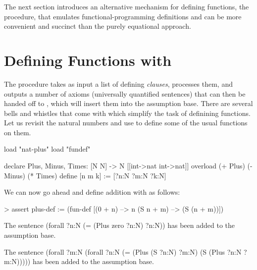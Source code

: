 The next section introduces an alternative mechanism for defining functions, the  procedure,
that emulates functional-programming definitions and can be more convenient and succinct than the purely
equational approach.

\section{Defining Functions with }

The  procedure takes as input
a list of defining {\em clauses}, processes them, and outputs
a number of axioms (universally quantified sentences) that 
can then be handed off to , which will insert 
them into the assumption base. There are several bells and
whistles that come with  which simplify 
the task of definining functions. Let us revisit the natural
numbers and use  to define some of the usual 
functions on them.
\begin{tcAthena}
load "nat-plus"
load "fundef"

declare Plus, Minus, Times: [N N] -> N [[int->nat int->nat]]
overload (+ Plus) (- Minus) (* Times)
define [n m k] := [?n:N ?m:N ?k:N]

\end{tcAthena}
We can now go ahead and define addition with  as follows:
\begin{tcAthena}
> assert plus-def := 
    (fun-def [(0 + n) --> n
              (S n + m) --> (S (n + m))])

The sentence 
(forall ?n:N
  (= (Plus zero ?n:N)
     ?n:N))
has been added to the assumption base.

The sentence 
(forall ?m:N
  (forall ?n:N
    (= (Plus (S ?n:N)
             ?m:N)
       (S (Plus ?n:N ?m:N)))))
has been added to the assumption base.
\end{tcAthena}


